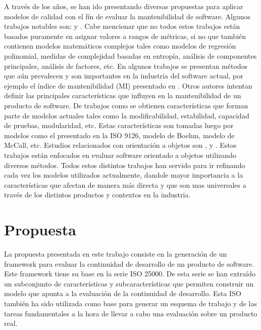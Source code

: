 \documentclass[letterpaper]{article}
\begin{document}
A través de los años, se han ido presentando diversas propuestas para aplicar modelos
de calidad con el fín de evaluar la mantenibilidad de software. Algunos trabajos
notables son: \cite{Coleman:1994} y \cite{Oman:1992}. Cabe mencionar que no todos estos trabajos
están basados puramente en asignar valores a rangos de métricas, si no que también
contienen modelos matemáticos complejos tales como modelos de regresión polinomial,
medidas de complejidad basadas en entropía, análisis de componentes principales, 
análisis de factores, etc.
En algunos trabajos se presentan métodos que aún prevalecen y son importantes en
la industria del software actual, por ejemplo el índice de mantenibilidad (MI) 
presentado en \cite{West:1996}.
Otros autores intentan definir las principales características que influyen en la
mantenibilidad de un producto de software. De trabajos como \cite{survey} se obtienen
características que forman parte de modelos actuales tales como la modificabilidad,
estabilidad, capacidad de pruebas, modularidad, etc. Estas características son 
tomadas luego por modelos como el presentado en la ISO 9126, modelo de Boehm,
modelo de McCall, etc.
Estudios relacionados con orientación a objetos son \cite{roadmap}, \cite{pastDecade} y \cite{TowardsACatalog}. Estos trabajos
están enfocados en evaluar software orientado a objetos utilizando diversos
métodos.
Todos estos distintos trabajos han servido para ir refinando cada vez los modelos
utilizados actualmente, dandole mayor importancia a la características que 
afectan de manera más directa y que son mas universales a través de los distintos
productos y contextos en la industria.

\section{Propuesta}

La propuesta presentada en este trabajo consiste en la generación de un framework
para evaluar la continuidad de desarrollo de un producto de software. Este
framework tiene su base en la serie ISO 25000. De esta serie se han extraído un 
subconjunto de características y subcaracterísticas
que permiten construir un modelo que apunta a la evaluación de la continuidad de desarrollo.
Esta ISO también ha sido utilizada como base para generar un esquema de trabajo y de
las tareas fundamentales a la hora de llevar a cabo una evaluación sobre un producto real.
\end{document}
